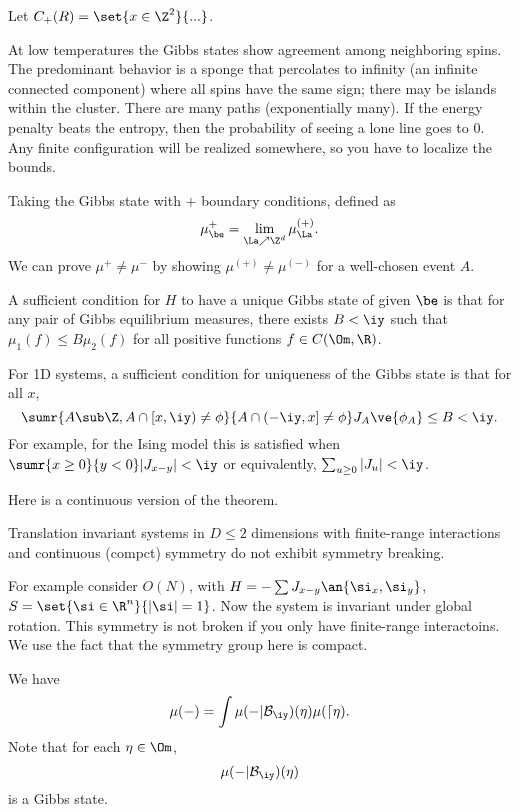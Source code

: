 Let $C_+(R) = \set{x\in\Z^2}{...}$. 

At low temperatures the Gibbs states show agreement among neighboring spins. 
The predominant behavior is a sponge that percolates to infinity (an infinite connected component) where all spins have the same sign; there may be islands within the cluster. 
There are many paths (exponentially many). If the energy penalty beats the entropy, then the probability of seeing a lone line goes to 0. 
Any finite configuration will be realized somewhere, so you have to localize the bounds.

Taking the Gibbs state with $+$ boundary conditions, defined as 
\[
\mu_\be^+ = \lim_{\La\nearrow \Z^d} \mu_\La^{(+)}.
\]
We can prove $\mu^+\ne \mu^-$ by showing $\mu^{(+)} \ne \mu^{(-)}$ for a well-chosen event $A$.

\begin{thm}
A sufficient condition for $H$ to have a unique Gibbs state of given $\be$ is that for any pair of Gibbs equilibrium measures, there exists $B<\iy$ such that  $\mu_1(f)\le B\mu_2(f)$ for all positive functions $f\in C(\Om, \R)$. 
\end{thm}

\begin{thm}
For 1D systems, a sufficient condition for uniqueness of the Gibbs state is that for all $x$,
\[
\sumr{A\sub \Z, A\cap [x,\iy)\ne \phi}{A\cap (-\iy,x] \ne \phi}
J_A \ve{\phi_A}\le B<\iy.
\]
For example, for the Ising model this is satisfied when
$
\sumr{x\ge 0}{y<0} |J_{x-y}|<\iy
$
or equivalently, $\sum_{u\ge 0} |J_u|<\iy$.
\end{thm}

Here is a continuous version of the theorem.
\begin{thm}
Translation invariant systems in $D\le 2$ dimensions with finite-range interactions and continuous (compct) symmetry do not exhibit symmetry breaking.
\end{thm}
For example consider $O(N)$, with $H=-\sum J_{x-y} \an{\si_{x},\si_{y}}$, $S=\set{\si\in \R^n}{|\si|=1}$.
Now the system is invariant under global rotation. This symmetry is not broken if you only have finite-range interactoins. We use the fact that the symmetry group here is compact.

We have
\[
\mu(-) = \int \mu(-|\cal B_\iy)(\eta) \mu(d\eta).
\]
Note that for each $\eta\in \Om$, 
\[
\mu(-|\cal B_\iy) (\eta)
\]
is a Gibbs state.

